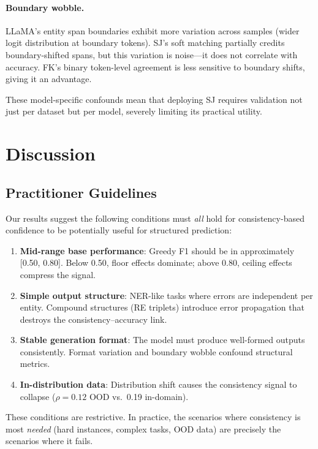 \documentclass[11pt,a4paper]{article}
\begin{document}
\paragraph{Boundary wobble.}
LLaMA's entity span boundaries exhibit more variation across samples (wider logit distribution at boundary tokens).
SJ's soft matching partially credits boundary-shifted spans, but this variation is noise---it does not correlate with accuracy.
FK's binary token-level agreement is less sensitive to boundary shifts, giving it an advantage.

These model-specific confounds mean that deploying SJ requires validation not just per dataset but per model, severely limiting its practical utility.

\section{Discussion}
\label{sec:discussion}

\subsection{Practitioner Guidelines}

Our results suggest the following conditions must \emph{all} hold for consistency-based confidence to be potentially useful for structured prediction:

\begin{enumerate}
\item \textbf{Mid-range base performance}: Greedy F1 should be in approximately [0.50, 0.80]. Below 0.50, floor effects dominate; above 0.80, ceiling effects compress the signal.
\item \textbf{Simple output structure}: NER-like tasks where errors are independent per entity. Compound structures (RE triplets) introduce error propagation that destroys the consistency--accuracy link.
\item \textbf{Stable generation format}: The model must produce well-formed outputs consistently. Format variation and boundary wobble confound structural metrics.
\item \textbf{In-distribution data}: Distribution shift causes the consistency signal to collapse ($\rho{=}0.12$ OOD vs.\ 0.19 in-domain).
\end{enumerate}

These conditions are restrictive. In practice, the scenarios where consistency is most \emph{needed} (hard instances, complex tasks, OOD data) are precisely the scenarios where it fails.
\end{document}
